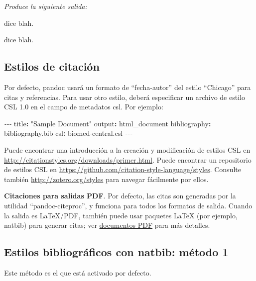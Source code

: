 \documentclass[12pt,a4paper,]{book}
\newenvironment{Shaded}{\begin{snugshade}}{\end{snugshade}}
\newcommand{\AttributeTok}[1]{\textcolor[rgb]{0.77,0.63,0.00}{#1}}
\newcommand{\FunctionTok}[1]{\textcolor[rgb]{0.00,0.00,0.00}{#1}}
\newcommand{\KeywordTok}[1]{\textcolor[rgb]{0.13,0.29,0.53}{\textbf{#1}}}
\newcommand{\PreprocessorTok}[1]{\textcolor[rgb]{0.56,0.35,0.01}{\textit{#1}}}
\newcommand{\StringTok}[1]{\textcolor[rgb]{0.31,0.60,0.02}{#1}}
\numberwithin{dummy}{section}
\theoremstyle{ocrenumbox}
\theoremstyle{blacknumex}
\theoremstyle{blacknumbox}
\theoremstyle{ocrenum}
\theoremstyle{ocrenum}
\begin{document}
\emph{Produce la siguiente salida:}

\citet{Luque2017} dice blah.

\citet[pág. 33]{Luque2017} dice blah.

\hypertarget{estilos-de-citaciuxf3n}{%
\subsection{Estilos de citación}\label{estilos-de-citaciuxf3n}}

Por defecto, pandoc usará un formato de ``fecha-autor'' del estilo
``Chicago'' para citas y referencias. Para usar otro estilo, deberá
especificar un archivo de estilo CSL 1.0 en el campo de metadatos csl.
Por ejemplo:

\begin{Shaded}
\begin{Highlighting}[]
\PreprocessorTok{{-}{-}{-}}
\FunctionTok{title}\KeywordTok{:}\AttributeTok{ }\StringTok{"Sample Document"}
\FunctionTok{output}\KeywordTok{:}\AttributeTok{ html\_document}
\FunctionTok{bibliography}\KeywordTok{:}\AttributeTok{ bibliography.bib}
\FunctionTok{csl}\KeywordTok{:}\AttributeTok{ biomed{-}central.csl}
\PreprocessorTok{{-}{-}{-}}
\end{Highlighting}
\end{Shaded}

Puede encontrar una introducción a la creación y modificación de estilos
CSL en \url{http://citationstyles.org/downloads/primer.html}. Puede
encontrar un repositorio de estilos CSL en
\url{https://github.com/citation-style-language/styles}. Consulte
también \url{http://zotero.org/styles} para navegar fácilmente por
ellos.

\textbf{Citaciones para salidas PDF}. Por defecto, las citas son
generadas por la utilidad ``pandoc-citeproc'', y funciona para todos los
formatos de salida. Cuando la salida es LaTeX/PDF, también puede usar
paquetes LaTeX (por ejemplo, natbib) para generar citas; ver
\href{https://bookdown.org/yihui/rmarkdown/pdf-document.html}{documentos
PDF} para más detalles.

\hypertarget{estilos-bibliogruxe1ficos-con-natbib-muxe9todo-1}{%
\subsection{Estilos bibliográficos con natbib: método
1}\label{estilos-bibliogruxe1ficos-con-natbib-muxe9todo-1}}

Este método es el que está activado por defecto.
\end{document}

